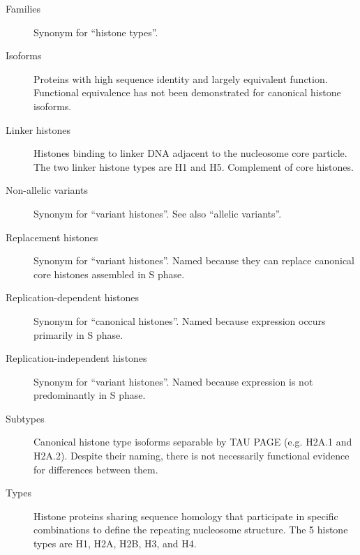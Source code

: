 {\begin{shaded}
\begin{description}
        \item[Families] \hfill \newline
        Synonym for ``histone types''.

        \item[Isoforms] \hfill \newline
        Proteins with high sequence identity and largely equivalent function.
        Functional equivalence has not been demonstrated for canonical histone isoforms.

        \item[Linker histones] \hfill \newline
        Histones binding to linker DNA adjacent to the nucleosome core particle.
        The two linker histone types are H1 and H5. Complement of core histones.

        \item[Non-allelic variants] \hfill \newline
        Synonym for ``variant histones''. See also ``allelic variants''.

        \item[Replacement histones] \hfill \newline
        Synonym for ``variant histones''.
        Named because they can replace canonical core histones assembled in S phase.

        \item[Replication-dependent histones] \hfill \newline
        Synonym for ``canonical histones''.
        Named because expression occurs primarily in S phase.

        \item[Replication-independent histones] \hfill \newline
        Synonym for ``variant histones''.
        Named because expression is not predominantly in S phase.

        \item[Subtypes] \hfill \newline
        Canonical histone type isoforms separable by TAU PAGE
        (e.g. H2A.1 and H2A.2).  Despite their naming, there is not necessarily functional evidence
        for differences between them.

        \item[Types] \hfill \newline
        Histone proteins sharing sequence homology
        that participate in specific combinations to define the repeating nucleosome structure.
        The 5 histone types are H1, H2A, H2B, H3, and H4.


\end{description}
\end{shaded}}
